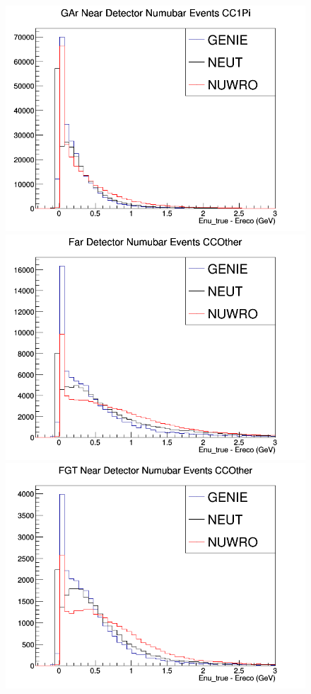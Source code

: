 \begin{figure}[h]
\endminipage
{}
\includegraphics[width=\linewidth]{Ereco_Etrue/numubar_GAr_CC1Pi.png}
\endminipage
\newline
{}
\includegraphics[width=\linewidth]{Ereco_Etrue/numubar_FD_CCOther.png}
\endminipage
{}
\includegraphics[width=\linewidth]{Ereco_Etrue/numubar_FGT_CCOther.png}

\end{figure}
